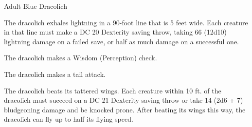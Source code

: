 \begin{monsterbox}{Adult Blue Dracolich}
\begin{monsteraction}
\end{monsteraction}
\begin{monsteraction}
The dracolich exhales lightning in a 90-foot line that is 5 feet wide. Each creature in that line must make a DC 20 Dexterity saving throw, taking 66 (12d10) lightning damage on a failed save, or half as much damage on a successful one.
\end{monsteraction}
\begin{monsteraction}[Detect]
The dracolich makes a Wisdom (Perception) check.
\end{monsteraction}
\begin{monsteraction}
The dracolich makes a tail attack.
\end{monsteraction}
\begin{monsteraction}
The dracolich beats its tattered wings. Each creature within 10 ft. of the dracolich must succeed on a DC 21 Dexterity saving throw or take 14 (2d6 + 7) bludgeoning damage and be knocked prone. After beating its wings this way, the dracolich can fly up to half its flying speed.
\end{monsteraction}
\end{monsterbox}